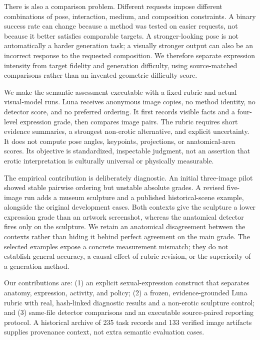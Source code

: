 \documentclass[11pt]{article}
\begin{document}
There is also a comparison problem. Different requests impose different combinations of pose, interaction, medium, and composition constraints. A binary success rate can change because a method was tested on easier requests, not because it better satisfies comparable targets. A stronger-looking pose is not automatically a harder generation task; a visually stronger output can also be an incorrect response to the requested composition. We therefore separate expression intensity from target fidelity and generation difficulty, using source-matched comparisons rather than an invented geometric difficulty score.

We make the semantic assessment executable with a fixed rubric and actual visual-model runs. Luna receives anonymous image copies, no method identity, no detector score, and no preferred ordering. It first records visible facts and a four-level expression grade, then compares image pairs. The rubric requires short evidence summaries, a strongest non-erotic alternative, and explicit uncertainty. It does not compute pose angles, keypoints, projections, or anatomical-area scores. Its objective is standardized, inspectable judgment, not an assertion that erotic interpretation is culturally universal or physically measurable.

The empirical contribution is deliberately diagnostic. An initial three-image pilot showed stable pairwise ordering but unstable absolute grades. A revised five-image run adds a museum sculpture and a published historical-scene example, alongside the original development cases. Both contexts give the sculpture a lower expression grade than an artwork screenshot, whereas the anatomical detector fires only on the sculpture. We retain an anatomical disagreement between the contexts rather than hiding it behind perfect agreement on the main grade. The selected examples expose a concrete measurement mismatch; they do not establish general accuracy, a causal effect of rubric revision, or the superiority of a generation method.

Our contributions are: (1) an explicit sexual-expression construct that separates anatomy, expression, activity, and policy; (2) a frozen, evidence-grounded Luna rubric with real, hash-linked diagnostic results and a non-erotic sculpture control; and (3) same-file detector comparisons and an executable source-paired reporting protocol. A historical archive of 235 task records and 133 verified image artifacts supplies provenance context, not extra semantic evaluation cases.
\end{document}
